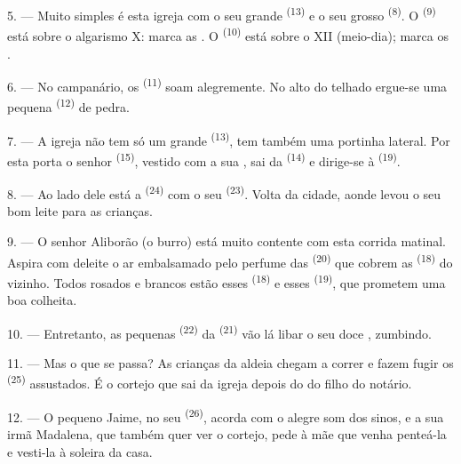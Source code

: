 5. --- Muito simples é esta igreja com o seu grande 
\textsuperscript{(13)} e o seu grosso  \textsuperscript{(8)}. O
 \textsuperscript{(9)} está sobre o algarismo X: marca
as . O  \textsuperscript{(10)} está sobre o XII
(meio-dia); marca os .

6. --- No campanário, os  \textsuperscript{(11)} soam alegremente.
No alto do telhado ergue-se uma pequena  \textsuperscript{(12)} de
pedra.

7. --- A igreja não tem só um grande  \textsuperscript{(13)}, tem
também uma portinha lateral. Por esta porta o senhor 
\textsuperscript{(15)}, vestido com a sua , sai da
 \textsuperscript{(14)} e dirige-se à 
\textsuperscript{(19)}.

8. --- Ao lado dele está a  \textsuperscript{(24)} com o seu
 \textsuperscript{(23)}. Volta da cidade, aonde levou o seu bom
leite para as crianças.

\VUsaut{4.0mm}
\VUsaut{3.4mm}

9. --- O senhor Aliborão (o burro) está muito contente com esta corrida
matinal. Aspira com deleite o ar embalsamado pelo perfume das
 \textsuperscript{(20)} que cobrem as 
\textsuperscript{(18)} do  vizinho. Todos rosados e brancos estão
esses  \textsuperscript{(18)} e esses 
\textsuperscript{(19)}, que prometem uma boa colheita.

10. --- Entretanto, as pequenas  \textsuperscript{(22)} da
 \textsuperscript{(21)} vão lá libar o seu doce ,
zumbindo.

11. --- Mas o que se passa? As crianças da aldeia chegam a
correr e fazem fugir os  \textsuperscript{(25)} assustados. É o
cortejo que sai da igreja depois do  do filho do
notário.

12. --- O pequeno Jaime, no seu  \textsuperscript{(26)}, acorda com
o alegre som dos sinos, e a sua irmã Madalena, que também quer ver o
cortejo, pede à mãe que venha penteá-la e vesti-la à soleira da casa.

